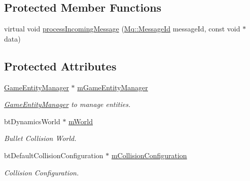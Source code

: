 \subsection*{Protected Member Functions}
\begin{DoxyCompactItemize}
\item 
virtual void \hyperlink{class_common_1_1_logic_system_a4495ecadf034103ad58deab6802543fa}{process\+Incoming\+Message} (\hyperlink{group___common_gaa8c87d2b450282716c906da283e149e6}{Mq\+::\+Message\+Id} message\+Id, const void $\ast$data)
\end{DoxyCompactItemize}
\subsection*{Protected Attributes}
\begin{DoxyCompactItemize}
\item 
\mbox{\label{class_common_1_1_logic_system_a2bd41b9185b04aa8d0cc243dacf07a30}} 
\hyperlink{class_common_1_1_game_entity_manager}{Game\+Entity\+Manager} $\ast$ \hyperlink{class_common_1_1_logic_system_a2bd41b9185b04aa8d0cc243dacf07a30}{m\+Game\+Entity\+Manager}
\begin{DoxyCompactList}\small\item\em \hyperlink{class_common_1_1_game_entity_manager}{Game\+Entity\+Manager} to manage entities. \end{DoxyCompactList}\item 
\mbox{\label{class_common_1_1_logic_system_a8ff50f813ec112a68298ccf2a44a5a8b}} 
bt\+Dynamics\+World $\ast$ \hyperlink{class_common_1_1_logic_system_a8ff50f813ec112a68298ccf2a44a5a8b}{m\+World}
\begin{DoxyCompactList}\small\item\em Bullet Collision World. \end{DoxyCompactList}\item 
\mbox{\label{class_common_1_1_logic_system_af317bbd8f5bda6b3516ced4e575da248}} 
bt\+Default\+Collision\+Configuration $\ast$ \hyperlink{class_common_1_1_logic_system_af317bbd8f5bda6b3516ced4e575da248}{m\+Collision\+Configuration}
\begin{DoxyCompactList}\small\item\em Collision Configuration. \end{DoxyCompactList}\item 

\end{DoxyCompactItemize}
